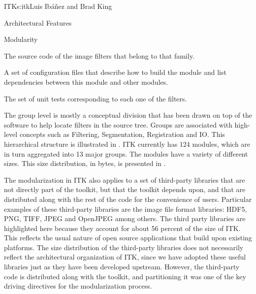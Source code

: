 \begin{aosachapter}{ITK}{s:itk}{Luis Ib\'{a}\~{n}ez and Brad King}
\begin{aosasect1}{Architectural Features}
\begin{aosasect2}{Modularity}
\begin{aosaenumerate}

\item The source code of the image filters that belong to that family.

\item A set of configuration files that describe how to build the module and
list dependencies between this module and other modules.

\item The set of unit tests corresponding to each one of the filters.

\end{aosaenumerate}


The group level is mostly a conceptual division that has been drawn on top of
the software to help locate filters in the source tree. Groups are associated
with high-level concepts such as Filtering, Segmentation, Registration and IO.
This hierarchical structure is illustrated in
.  ITK currently has 124 modules, which are
in turn aggregated into 13 major groups.  The modules have a variety of
different sizes. This size distribution, in bytes, is presented in
.

\newpage %


The modularization in ITK also applies to a set of third-party libraries
that are not directly part of the toolkit, but that the toolkit depends upon,
and that are distributed along with the rest of the code for the convenience of
users. Particular examples of these third-party libraries are the image file
format libraries: HDF5, PNG, TIFF, JPEG and OpenJPEG among others.  The third
party libraries are highlighted here because they account for about 56 percent of the
size of ITK. This reflects the usual nature of open source applications that
build upon existing platforms. The size distribution of the third-party
libraries does not necessarily reflect the architectural organization of ITK,
since we have adopted these useful libraries just as they have been developed
upstream. However, the third-party code is distributed along with the toolkit,
and partitioning it was one of the key driving directives for the
modularization process.


\end{aosasect2}
\end{aosasect1}
\end{aosachapter}
